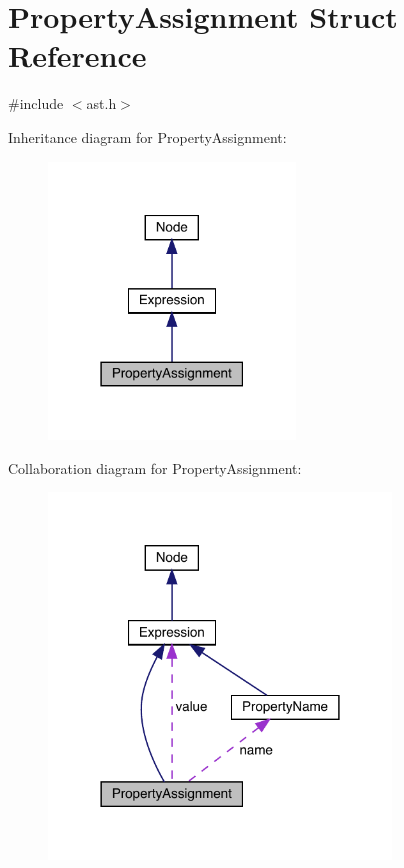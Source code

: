 \hypertarget{struct_property_assignment}{}\section{Property\+Assignment Struct Reference}
\label{struct_property_assignment}


{\ttfamily \#include $<$ast.\+h$>$}



Inheritance diagram for Property\+Assignment\+:\nopagebreak
\begin{figure}[H]
\begin{center}
\leavevmode
\includegraphics[width=186pt]{struct_property_assignment__inherit__graph}
\end{center}
\end{figure}


Collaboration diagram for Property\+Assignment\+:\nopagebreak
\begin{figure}[H]
\begin{center}
\leavevmode
\includegraphics[width=258pt]{struct_property_assignment__coll__graph}
\end{center}
\end{figure}

